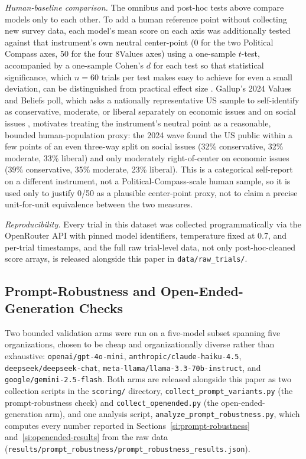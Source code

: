 \documentclass[11pt]{article}
\begin{document}
\textit{Human-baseline comparison.} The omnibus and post-hoc tests above
compare models only to each other. To add a human reference point without
collecting new survey data, each model's mean score on each axis was
additionally tested against that instrument's own neutral center-point (0
for the two Political Compass axes, 50 for the four 8Values axes) using a
one-sample $t$-test, accompanied by a one-sample Cohen's $d$ for each test so
that statistical significance, which $n=60$ trials per test makes easy to
achieve for even a small deviation, can be distinguished from practical
effect size \citep{cohen1988}. Gallup's 2024 Values and Beliefs poll, which
asks a nationally representative US sample to self-identify as conservative,
moderate, or liberal separately on economic issues and on social issues
\citep{gallup2024values}, motivates treating the instrument's neutral point
as a reasonable, bounded human-population proxy: the 2024 wave found the US
public within a few points of an even three-way split on social issues (32\%
conservative, 32\% moderate, 33\% liberal) and only moderately right-of-center
on economic issues (39\% conservative, 35\% moderate, 23\% liberal). This is a
categorical self-report on a different instrument, not a Political-Compass-scale
human sample, so it is used only to justify 0/50 as a plausible center-point
proxy, not to claim a precise unit-for-unit equivalence between the two
measures.

\textit{Reproducibility.} Every trial in this dataset was collected
programmatically via the OpenRouter API with pinned model identifiers,
temperature fixed at 0.7, and per-trial timestamps, and the full raw
trial-level data, not only post-hoc-cleaned score arrays, is released
alongside this paper in \texttt{data/raw\_trials/}.

\subsection{Prompt-Robustness and Open-Ended-Generation Checks}
\label{si:robustness-checks}

Two bounded validation arms were run on a five-model subset spanning five
organizations, chosen to be cheap and organizationally diverse rather than
exhaustive: \texttt{openai/gpt-4o-mini}, \texttt{anthropic/claude-haiku-4.5},
\texttt{deepseek/deepseek-chat}, \texttt{meta-llama/llama-3.3-70b-instruct},
and \texttt{google/gemini-2.5-flash}. Both arms are released alongside this
paper as two collection scripts in the \texttt{scoring/} directory,
\texttt{collect\_prompt\_variants.py} (the prompt-robustness check) and
\texttt{collect\_openended.py} (the open-ended-generation arm), and one
analysis script, \texttt{analyze\_prompt\_robustness.py}, which computes
every number reported in Sections~\ref{si:prompt-robustness}
and~\ref{si:openended-results} from the raw data
(\texttt{results/prompt\_robustness/prompt\_robustness\_results.json}).
\end{document}
